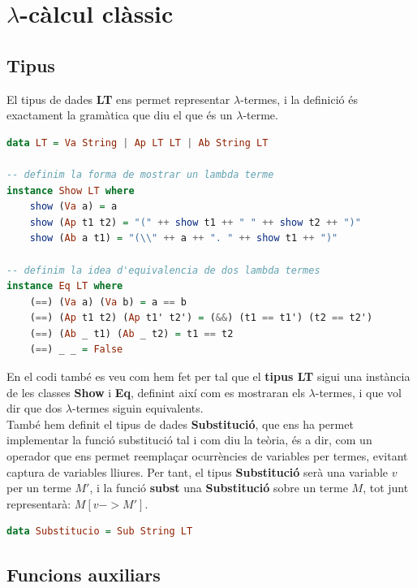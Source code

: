 \documentclass[10pt,a4paper]{article}
\begin{document}
\tableofcontents

\clearpage

\section{$\lambda$-càlcul clàssic}

\subsection{Tipus}

El tipus de dades \textbf{LT} ens permet representar $\lambda$-termes, i la definició és exactament la gramàtica que diu el que és un $\lambda$-terme.

\begin{lstlisting}[language=Haskell]
data LT = Va String | Ap LT LT | Ab String LT

-- definim la forma de mostrar un lambda terme
instance Show LT where
    show (Va a) = a
    show (Ap t1 t2) = "(" ++ show t1 ++ " " ++ show t2 ++ ")"
    show (Ab a t1) = "(\\" ++ a ++ ". " ++ show t1 ++ ")"

-- definim la idea d'equivalencia de dos lambda termes
instance Eq LT where
    (==) (Va a) (Va b) = a == b
    (==) (Ap t1 t2) (Ap t1' t2') = (&&) (t1 == t1') (t2 == t2')
    (==) (Ab _ t1) (Ab _ t2) = t1 == t2
    (==) _ _ = False
\end{lstlisting}

En el codi també es veu com hem fet per tal que el \textbf{tipus LT} sigui una instància de les classes \textbf{Show} i \textbf{Eq}, definint així com es mostraran els $\lambda$-termes, i que vol dir que dos $\lambda$-termes siguin equivalents. \\

També hem definit el tipus de dades \textbf{Substitució}, que ens ha permet implementar la funció substitució tal i com diu la teòria, és a dir, com un operador que ens permet reemplaçar ocurrències de variables per termes, evitant captura de variables lliures. Per tant, el tipus \textbf{Substitució} serà una variable $v$ per un terme $M'$, i la funció \textbf{subst} una \textbf{Substitució} sobre un terme $M$, tot junt representarà: $M [v -> M']$.

\begin{lstlisting}[language=Haskell]
data Substitucio = Sub String LT
\end{lstlisting}

\subsection{Funcions auxiliars}
\end{document}
